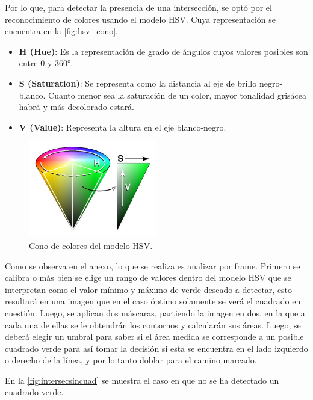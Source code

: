 \documentclass[11pt,a4paper]{article}
\begin{document}
	Por lo que, para detectar la presencia de una intersección, se optó por el reconocimiento de colores usando el modelo HSV. Cuya representación se encuentra en la \autoref*{fig:hsv_cono}.
	
	\begin{itemize}
		\item \textbf{H (Hue)}: Es la representación de grado de ángulos cuyos valores posibles son entre 0 y 360°.
		\item \textbf{S (Saturation)}: Se representa como la distancia al eje de brillo negro-blanco. Cuanto menor sea la saturación de un color, mayor tonalidad grisácea habrá y más decolorado estará.
		\item \textbf{V (Value)}: Representa la altura en el eje blanco-negro. 
	\end{itemize}
	
	\begin{figure}[h!]
		\centering
		\includegraphics[width=0.5\textwidth]{imagenes/HSV_cone.jpg}
		\caption{Cono de colores del modelo HSV.}
		\label{fig:hsv_cono}
	\end{figure} 
	
	Como se observa en el anexo, lo que se realiza es analizar por frame. Primero se calibra o más bien se elige un rango de valores dentro del modelo HSV que se interpretan como el valor mínimo y máximo de verde deseado a detectar, esto resultará en una imagen que en el caso óptimo solamente se verá el cuadrado en cuestión. Luego, se aplican dos máscaras, partiendo la imagen en dos, en la que a cada una de ellas se le obtendrán los contornos y calcularán sus áreas. Luego, se deberá elegir un umbral para saber si el área medida se corresponde a un posible cuadrado verde para así tomar la decisión si esta se encuentra en el lado izquierdo o derecho de la línea, y por lo tanto doblar para el camino marcado.
	
	En la \autoref*{fig:intersecsincuad} se muestra el caso en que no se ha detectado un cuadrado verde.
	
\end{document}
